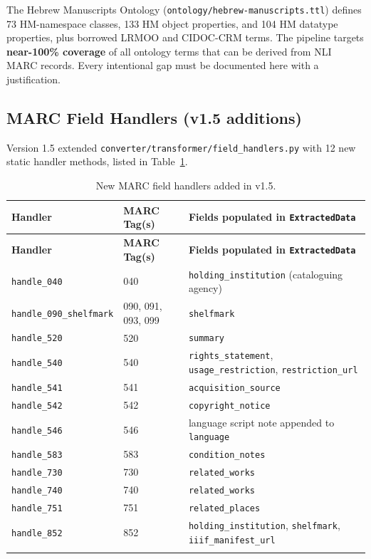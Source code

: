 \documentclass[12pt]{article}
\newcommand{\filepath}[1]{\texttt{\small #1}}
\newcommand{\code}[1]{\texttt{#1}}
\begin{document}
The Hebrew Manuscripts Ontology (\filepath{ontology/hebrew-manuscripts.ttl}) defines 73 HM-namespace classes, 133 HM object properties, and 104 HM datatype properties, plus borrowed LRMOO and CIDOC-CRM terms. The pipeline targets \textbf{near-100\% coverage} of all ontology terms that can be derived from NLI MARC records. Every intentional gap must be documented here with a justification.

\subsection{MARC Field Handlers (v1.5 additions)}

Version 1.5 extended \filepath{converter/transformer/field\_handlers.py} with 12 new static handler methods, listed in Table~\ref{tbl:v15-handlers}.

\begin{longtable}{|l|p{4cm}|p{5cm}|}
\hline
\textbf{Handler} & \textbf{MARC Tag(s)} & \textbf{Fields populated in \code{ExtractedData}} \\
\hline
\endfirsthead
\hline
\textbf{Handler} & \textbf{MARC Tag(s)} & \textbf{Fields populated in \code{ExtractedData}} \\
\hline
\endhead
\hline
\endfoot
\code{handle\_040} & 040 & \code{holding\_institution} (cataloguing agency) \\
\hline
\code{handle\_090\_shelfmark} & 090, 091, 093, 099 & \code{shelfmark} \\
\hline
\code{handle\_520} & 520 & \code{summary} \\
\hline
\code{handle\_540} & 540 & \code{rights\_statement}, \code{usage\_restriction}, \code{restriction\_url} \\
\hline
\code{handle\_541} & 541 & \code{acquisition\_source} \\
\hline
\code{handle\_542} & 542 & \code{copyright\_notice} \\
\hline
\code{handle\_546} & 546 & language script note appended to \code{language} \\
\hline
\code{handle\_583} & 583 & \code{condition\_notes} \\
\hline
\code{handle\_730} & 730 & \code{related\_works} \\
\hline
\code{handle\_740} & 740 & \code{related\_works} \\
\hline
\code{handle\_751} & 751 & \code{related\_places} \\
\hline
\code{handle\_852} & 852 & \code{holding\_institution}, \code{shelfmark}, \code{iiif\_manifest\_url} \\
\hline
\caption{New MARC field handlers added in v1.5.}
\label{tbl:v15-handlers}
\end{longtable}
\end{document}
